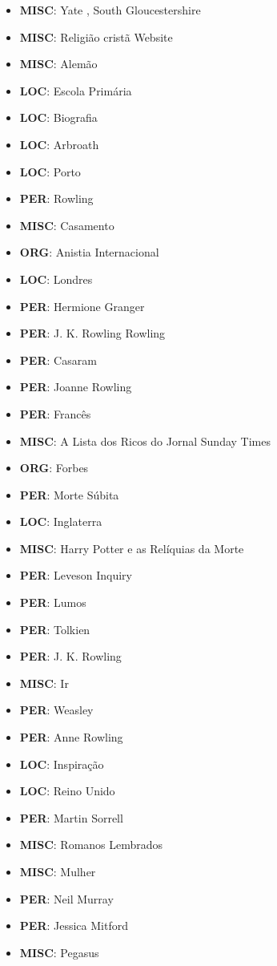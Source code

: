 \documentclass{article}
\begin{document}
\begin{itemize}
\item \textbf{MISC}: Yate , South Gloucestershire
\item \textbf{MISC}: Religião cristã Website
\item \textbf{MISC}: Alemão
\item \textbf{LOC}: Escola Primária
\item \textbf{LOC}: Biografia
\item \textbf{LOC}: Arbroath
\item \textbf{LOC}: Porto
\item \textbf{PER}: Rowling
\item \textbf{MISC}: Casamento
\item \textbf{ORG}: Anistia Internacional
\item \textbf{LOC}: Londres
\item \textbf{PER}: Hermione Granger
\item \textbf{PER}: J. K. Rowling Rowling
\item \textbf{PER}: Casaram
\item \textbf{PER}: Joanne Rowling
\item \textbf{PER}: Francês
\item \textbf{MISC}: A Lista dos Ricos do Jornal Sunday Times
\item \textbf{ORG}: Forbes
\item \textbf{PER}: Morte Súbita
\item \textbf{LOC}: Inglaterra
\item \textbf{MISC}: Harry Potter e as Relíquias da Morte
\item \textbf{PER}: Leveson Inquiry
\item \textbf{PER}: Lumos
\item \textbf{PER}: Tolkien
\item \textbf{PER}: J. K. Rowling
\item \textbf{MISC}: Ir
\item \textbf{PER}: Weasley
\item \textbf{PER}: Anne Rowling
\item \textbf{LOC}: Inspiração
\item \textbf{LOC}: Reino Unido
\item \textbf{PER}: Martin Sorrell
\item \textbf{MISC}: Romanos Lembrados
\item \textbf{MISC}: Mulher
\item \textbf{PER}: Neil Murray
\item \textbf{PER}: Jessica Mitford
\item \textbf{MISC}: Pegasus

\end{itemize}
\end{document}
